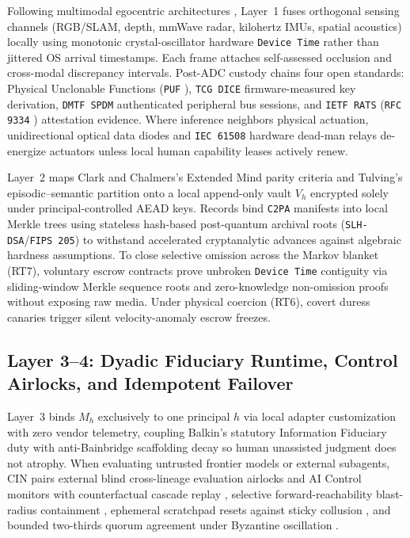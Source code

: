 \documentclass[11pt]{article}
\begin{document}
Following multimodal egocentric architectures \citep{engel2023aria}, Layer~1 fuses orthogonal sensing channels (RGB/SLAM, depth, mmWave radar, kilohertz IMUs, spatial acoustics) locally using monotonic crystal-oscillator hardware \texttt{Device Time} rather than jittered OS arrival timestamps. Each frame attaches self-assessed occlusion and cross-modal discrepancy intervals. Post-ADC custody chains four open standards: Physical Unclonable Functions (\texttt{PUF} \citep{gassend2002puf}), \texttt{TCG DICE} firmware-measured key derivation, \texttt{DMTF SPDM} authenticated peripheral bus sessions, and \texttt{IETF RATS} (\texttt{RFC 9334} \citep{birkholz2023rats}) attestation evidence. Where inference neighbors physical actuation, unidirectional optical data diodes and \texttt{IEC 61508} hardware dead-man relays \citep{leveson2011engineering} de-energize actuators unless local human capability leases actively renew.

Layer~2 maps Clark and Chalmers's Extended Mind parity criteria \citep{clark1998extended} and Tulving's episodic--semantic partition \citep{tulving2002episodic} onto a local append-only vault $V_h$ encrypted solely under principal-controlled AEAD keys. Records bind \texttt{C2PA} manifests into local Merkle trees using stateless hash-based post-quantum archival roots (\texttt{SLH-DSA}/\texttt{FIPS 205}) to withstand accelerated cryptanalytic advances against algebraic hardness assumptions. To close selective omission across the Markov blanket (RT7), voluntary escrow contracts prove unbroken \texttt{Device Time} contiguity via sliding-window Merkle sequence roots and zero-knowledge non-omission proofs without exposing raw media. Under physical coercion (RT6), covert duress canaries trigger silent velocity-anomaly escrow freezes.

\subsection{Layer 3--4: Dyadic Fiduciary Runtime, Control Airlocks, and Idempotent Failover}

Layer~3 binds $M_h$ exclusively to one principal $h$ via local adapter customization with zero vendor telemetry, coupling Balkin's statutory Information Fiduciary duty \citep{balkin2016fiduciaries} with anti-Bainbridge scaffolding decay \citep{bainbridge1983ironies} so human unassisted judgment does not atrophy. When evaluating untrusted frontier models or external subagents, CIN pairs external blind cross-lineage evaluation airlocks and AI Control monitors \citep{greenblatt2024control, kutasov2025shade} with counterfactual cascade replay \citep{hu2026cascadeledger}, selective forward-reachability blast-radius containment \citep{zhan2026airlock}, ephemeral scratchpad resets against sticky collusion \citep{cahyono2026sticky}, and bounded two-thirds quorum agreement under Byzantine oscillation \citep{berdoz2026agree}.
\end{document}
